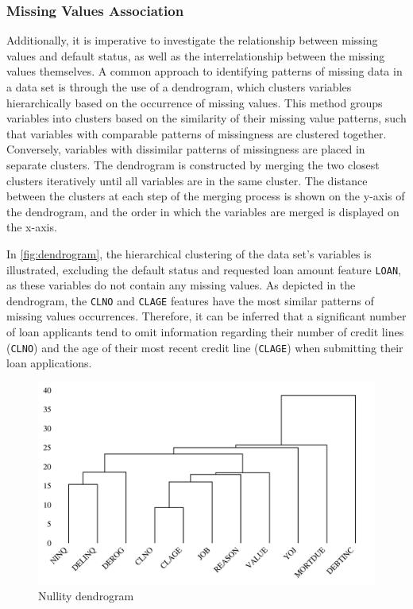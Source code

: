 \subsubsection{Missing Values Association}
Additionally, it is imperative to investigate the relationship between missing values and default status, as well as the interrelationship between the missing values themselves.
A common approach to identifying patterns of missing data in a data set is through the use of a dendrogram, which clusters variables hierarchically based on the occurrence of missing values.
This method groups variables into clusters based on the similarity of their missing value patterns, such that variables with comparable patterns of missingness are clustered together.
Conversely, variables with dissimilar patterns of missingness are placed in separate clusters.
The dendrogram is constructed by merging the two closest clusters iteratively until all variables are in the same cluster.
The distance between the clusters at each step of the merging process is shown on the y-axis of the dendrogram, and the order in which the variables are merged is displayed on the x-axis.

In \autoref{fig:dendrogram}, the hierarchical clustering of the data set's variables is illustrated, excluding the default status and requested loan amount feature \texttt{LOAN}, as these variables do not contain any missing values.
As depicted in the dendrogram, the \texttt{CLNO} and \texttt{CLAGE} features have the most similar patterns of missing values occurrences.
Therefore, it can be inferred that a significant number of loan applicants tend to omit information regarding their number of credit lines (\texttt{CLNO}) and the age of their most recent credit line (\texttt{CLAGE}) when submitting their loan applications.

\begin{figure}[H]
    \centering
    \caption{Nullity dendrogram}\vspace{0.5em}
    \label{fig:dendrogram}
    \includegraphics[width=140mm]{Figures/NA_Dendrogram.jpg}
    \vspace{-1em}
\end{figure}

